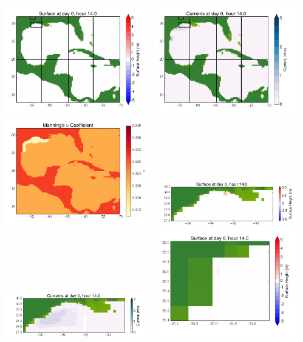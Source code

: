 \documentclass[11pt]{article}
\begin{document}
\vskip 10pt 
\includegraphics[width=0.475\textwidth]{frame0086fig1.png}
\includegraphics[width=0.475\textwidth]{frame0086fig2.png}
\vskip 10pt 
\includegraphics[width=0.475\textwidth]{frame0086fig3.png}
\includegraphics[width=0.475\textwidth]{frame0086fig4.png}
\vskip 10pt 
\includegraphics[width=0.475\textwidth]{frame0086fig5.png}
\includegraphics[width=0.475\textwidth]{frame0086fig6.png}
\end{document}
